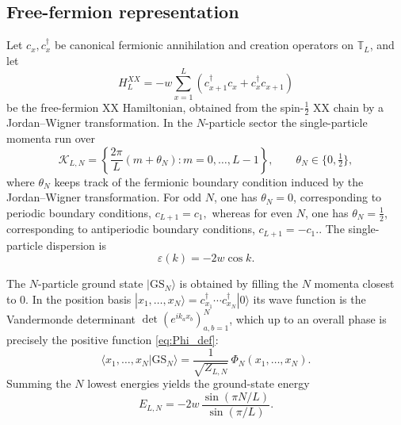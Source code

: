 \documentclass[11pt]{article}
\numberwithin{equation}{section}
\newcommand{\1}{\mathbf 1}
\begin{document}
\subsection{Free-fermion representation}
\label{subsec:freefermions}

Let \(c_x,c_x^\dagger\) be canonical fermionic annihilation and creation
operators on \(\mathbb T_L\), and let
\begin{equation}
    H_{L}^{XX}
    =
    -w
    \sum_{x=1}^{L}
    \left(
    c_{x+1}^\dagger c_x
    +
    c_x^\dagger c_{x+1}
    \right)
    \label{eq:xx_hamiltonian}
\end{equation}
be the free-fermion XX Hamiltonian, obtained from the spin-\(\tfrac12\) XX chain
by a Jordan--Wigner transformation.  In the \(N\)-particle sector the
single-particle momenta run over
\[
    \mathcal K_{L,N}
    =
    \left\{
    \frac{2\pi}{L}(m+\theta_N):
    m=0,\ldots,L-1
    \right\},
    \qquad \theta_N\in\{0,\tfrac12\},
\]
where $\theta_N$ keeps track of the fermionic boundary condition
induced by the Jordan--Wigner transformation.  For odd $N$, one has
$\theta_N=0$, corresponding to periodic boundary conditions,
$
c_{L+1}=c_1,
$
whereas for even $N$, one has $\theta_N=\frac{1}{2}$, corresponding to
antiperiodic boundary conditions,
$
c_{L+1}=-c_1.
$.
The single-particle dispersion is
\begin{equation}
    \varepsilon(k)=-2w\cos k.
    \label{eq:dispersion}
\end{equation}

The \(N\)-particle ground state \(|\mathrm{GS}_N\rangle\) is obtained by filling
the \(N\) momenta closest to \(0\).  In the position basis
\(|x_1,\ldots,x_N\rangle=c_{x_1}^\dagger\cdots c_{x_N}^\dagger|0\rangle\) its wave
function is the Vandermonde determinant \(\det(e^{ik_a x_b})_{a,b=1}^N\), which up
to an overall phase is precisely the positive function \eqref{eq:Phi_def}:
\begin{equation}
    \langle x_1,\ldots,x_N|\mathrm{GS}_N\rangle
    =
    \frac{1}{\sqrt{Z_{L,N}}}\,\Phi_N(x_1,\ldots,x_N).
    \label{eq:gs_wavefunction_phi}
\end{equation}
Summing the \(N\) lowest energies yields the ground-state energy
\begin{equation}
    E_{L,N}
    =
    -2w\,
    \frac{\sin(\pi N/L)}{\sin(\pi/L)}.
    \label{eq:ground_state_energy}
\end{equation}
\end{document}
